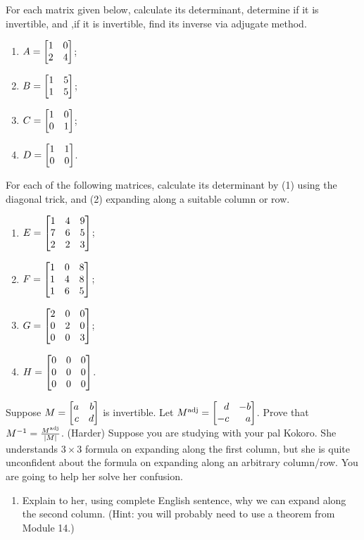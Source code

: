 \begin{exercises}
\begin{problist}
  \prob For each matrix given below, calculate its determinant, determine if it is invertible, and ,if it is invertible, find its inverse via adjugate method.
  \begin{enumerate}
    \item \(A=\mat{1 & 0 \\ 2 & 4}\);
    \item \(B=\mat{1 & 5 \\ 1 & 5}\);
    \item \(C=\mat{1 & 0 \\ 0 & 1}\);
    \item \(D=\mat{1 & 1 \\ 0 & 0}\).
  \end{enumerate}
  \prob For each of the following matrices, calculate its determinant by (1) using the diagonal trick, and (2) expanding along a suitable column or row.
  \begin{enumerate}
  \item \(E=\mat{1 & 4 & 9 \\ 7 & 6 & 5 \\ 2 & 2 & 3}\);
  \item \(F=\mat{1 & 0 & 8 \\ 1 & 4 & 8 \\ 1 & 6 & 5}\);
  \item \(G=\mat{2 & 0 & 0 \\ 0 & 2 & 0 \\ 0 & 0 & 3}\);
  \item \(H=\mat{0 & 0 & 0 \\ 0 & 0 & 0 \\ 0 & 0 & 0}\).
  \end{enumerate}
  \prob Suppose \(M=\mat{a & b \\ c & d}\) is invertible. Let \(M^{\text{adj}}=\mat{d & -b \\ -c & a}\). Prove that \(M^{-1}=\frac{M^{\text{adj}}}{\lvert M\rvert}\).
  \prob (Harder) Suppose you are studying with your pal Kokoro. She understands \(3\times 3\) formula on expanding along the first column, but she is quite unconfident about the formula on expanding along an arbitrary column/row. You are going to help her solve her confusion.
      \begin{enumerate}
        \item Explain to her, using complete English sentence, why we can expand along the second column. (Hint: you will probably need to use a theorem from Module 14.)

\end{enumerate}
\end{problist}
\end{exercises}
